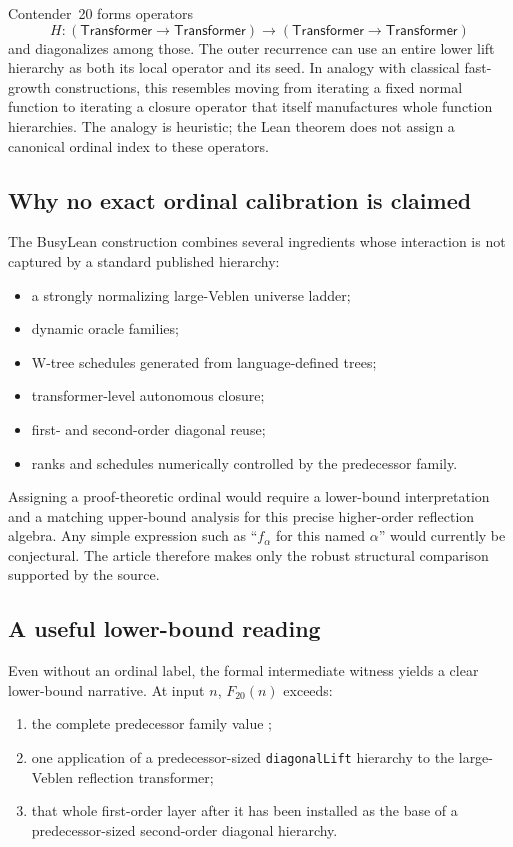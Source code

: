 \documentclass[11pt]{article}
\theoremstyle{definition}
\theoremstyle{remark}
\newcommand{\lean}[1]{\nolinkurl{#1}}
\newcommand{\leancode}[1]{\texttt{\detokenize{#1}}}
\newcommand{\Tr}{\mathsf{Transformer}}
\begin{document}
Contender~20 forms operators
\[
  H:(\Tr\to\Tr)\to(\Tr\to\Tr)
\]
and diagonalizes among those. The outer recurrence can use an entire lower
lift hierarchy as both its local operator and its seed. In analogy with
classical fast-growth constructions, this resembles moving from iterating a
fixed normal function to iterating a closure operator that itself manufactures
whole function hierarchies. The analogy is heuristic; the Lean theorem does not
assign a canonical ordinal index to these operators.

\subsection{Why no exact ordinal calibration is claimed}

The BusyLean construction combines several ingredients whose interaction is
not captured by a standard published hierarchy:

\begin{itemize}[leftmargin=*]
\item a strongly normalizing large-Veblen universe ladder;
\item dynamic oracle families;
\item W-tree schedules generated from language-defined trees;
\item transformer-level autonomous closure;
\item first- and second-order diagonal reuse;
\item ranks and schedules numerically controlled by the predecessor family.
\end{itemize}

Assigning a proof-theoretic ordinal would require a lower-bound interpretation
and a matching upper-bound analysis for this precise higher-order reflection
algebra. Any simple expression such as ``$f_\alpha$ for this named $\alpha$''
would currently be conjectural. The article therefore makes only the robust
structural comparison supported by the source.

\subsection{A useful lower-bound reading}

Even without an ordinal label, the formal intermediate witness yields a clear
lower-bound narrative. At input $n$, $F_{20}(n)$ exceeds:

\begin{enumerate}[leftmargin=*]
\item the complete predecessor family value \leancode{family19 n};
\item one application of a predecessor-sized \lean{diagonalLift} hierarchy to
  the large-Veblen reflection transformer;
\item that whole first-order layer after it has been installed as the base of a
  predecessor-sized second-order diagonal hierarchy.
\end{enumerate}
\end{document}
